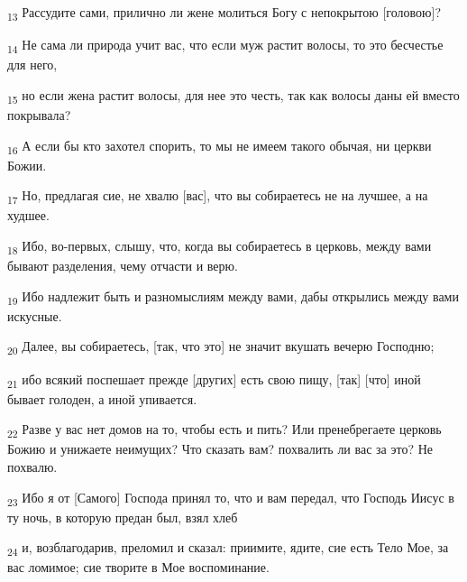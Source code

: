 \begin{tcolorbox}
\textsubscript{13} Рассудите сами, прилично ли жене молиться Богу с непокрытою [головою]?
\end{tcolorbox}
\begin{tcolorbox}
\textsubscript{14} Не сама ли природа учит вас, что если муж растит волосы, то это бесчестье для него,
\end{tcolorbox}
\begin{tcolorbox}
\textsubscript{15} но если жена растит волосы, для нее это честь, так как волосы даны ей вместо покрывала?
\end{tcolorbox}
\begin{tcolorbox}
\textsubscript{16} А если бы кто захотел спорить, то мы не имеем такого обычая, ни церкви Божии.
\end{tcolorbox}
\begin{tcolorbox}
\textsubscript{17} Но, предлагая сие, не хвалю [вас], что вы собираетесь не на лучшее, а на худшее.
\end{tcolorbox}
\begin{tcolorbox}
\textsubscript{18} Ибо, во-первых, слышу, что, когда вы собираетесь в церковь, между вами бывают разделения, чему отчасти и верю.
\end{tcolorbox}
\begin{tcolorbox}
\textsubscript{19} Ибо надлежит быть и разномыслиям между вами, дабы открылись между вами искусные.
\end{tcolorbox}
\begin{tcolorbox}
\textsubscript{20} Далее, вы собираетесь, [так, что это] не значит вкушать вечерю Господню;
\end{tcolorbox}
\begin{tcolorbox}
\textsubscript{21} ибо всякий поспешает прежде [других] есть свою пищу, [так] [что] иной бывает голоден, а иной упивается.
\end{tcolorbox}
\begin{tcolorbox}
\textsubscript{22} Разве у вас нет домов на то, чтобы есть и пить? Или пренебрегаете церковь Божию и унижаете неимущих? Что сказать вам? похвалить ли вас за это? Не похвалю.
\end{tcolorbox}
\begin{tcolorbox}
\textsubscript{23} Ибо я от [Самого] Господа принял то, что и вам передал, что Господь Иисус в ту ночь, в которую предан был, взял хлеб
\end{tcolorbox}
\begin{tcolorbox}
\textsubscript{24} и, возблагодарив, преломил и сказал: приимите, ядите, сие есть Тело Мое, за вас ломимое; сие творите в Мое воспоминание.
\end{tcolorbox}
